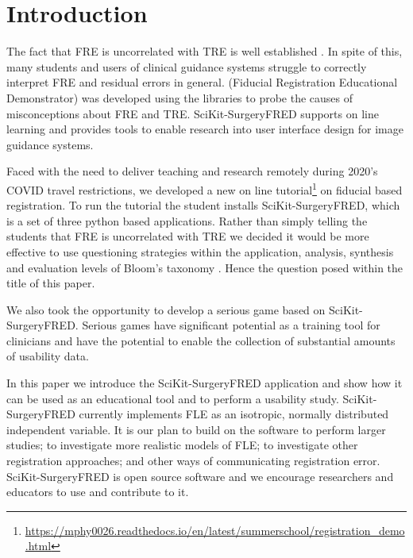 \section{Introduction}
The fact that \gls{FRE} is uncorrelated with \gls{TRE} is well established 
\cite{fitzpatrick2009}. In spite of this, many students and users of clinical guidance systems struggle to 
correctly interpret \gls{FRE} and residual errors in general. 
\fred (Fiducial Registration Educational Demonstrator)
 \cite{stephen_thompson_2020_4314971} was developed using the 
\sksurgery \cite{PMID:32436132} libraries to probe the causes of misconceptions 
about \gls{FRE} and \gls{TRE}. SciKit-SurgeryFRED supports on line learning and provides tools to enable 
research into user interface design for image guidance systems. 

Faced with the need to deliver teaching and research remotely during 2020's {COVID} travel restrictions, we 
developed a new on line tutorial\footnote{\url{https://mphy0026.readthedocs.io/en/latest/summerschool/registration_demo.html}}
on fiducial based registration. To run the tutorial the student installs SciKit-SurgeryFRED, which is a 
set of three python based applications. Rather than simply telling the students that \gls{FRE} is uncorrelated with \gls{TRE} 
we decided it would be more effective to use questioning strategies within the application, analysis, synthesis and 
evaluation levels of Bloom's taxonomy \cite{blooms_tax}. Hence the question posed within the title of this paper. 

We also took the opportunity to develop a serious game based on SciKit-SurgeryFRED. Serious games have significant potential 
as a training tool for clinicians \cite{PMID:28133947} and have the potential to enable the collection of substantial amounts of 
usability data. 

In this paper we introduce the SciKit-SurgeryFRED application and show how it can
be used as an educational tool and to perform a usability study. SciKit-SurgeryFRED 
currently implements \gls{FLE} as an isotropic, normally distributed independent variable. 
It is our plan to build on 
the software to perform larger studies; to investigate more realistic models of \gls{FLE};
to investigate other registration approaches; and other ways of communicating registration error. 
SciKit-SurgeryFRED is open 
source software and we encourage researchers and educators to use and contribute to it. 

